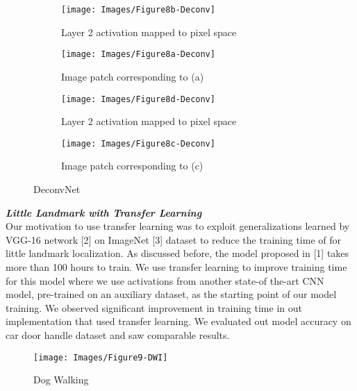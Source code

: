 \documentclass [11pt,letterpaper ,twoside ,openany ]{report}
\begin{document}
    \begin{figure}[h]
    \centering
        \begin{subfigure}[b]{0.22\linewidth}
            \centering
            \texttt{[image: Images/Figure8b-Deconv]}
            \caption{Layer 2 activation mapped to pixel space}
        \end{subfigure}    
        \begin{subfigure}[b]{0.22\linewidth}
            \centering
            \texttt{[image: Images/Figure8a-Deconv]}
            \caption{Image patch corresponding to (a)}
        \end{subfigure}
        \begin{subfigure}[b]{0.22\linewidth}
            \centering
            \texttt{[image: Images/Figure8d-Deconv]}
            \caption{Layer 2 activation mapped to pixel space}
        \end{subfigure}                
        \begin{subfigure}[b]{0.22\linewidth}
            \centering
            \texttt{[image: Images/Figure8c-Deconv]}
            \caption{Image patch corresponding to (c)}
        \end{subfigure}
        \caption{DeconvNet}
        \label{fig:devonv}
    \end{figure}

    \noindent
    \textbf{\textit{Little Landmark with Transfer Learning}}\\    
    Our motivation to use transfer learning was to exploit generalizations learned by VGG-16 network [2] on ImageNet [3] dataset to reduce the training time of for little landmark localization. As discussed before, the model proposed in [1] takes more than 100 hours to train. We use transfer learning to improve training time for this model where we use activations from another state-of the-art CNN model, pre-trained on an auxiliary dataset, as the starting point of our model training. We observed significant improvement in training time in out implementation that used transfer learning. We evaluated out model accuracy on car door handle dataset and saw comparable results.

    \begin{wrapfigure}{l}[9mm]{0.5\textwidth}
        \begin{center}
            \texttt{[image: Images/Figure9-DWI]}
        \end{center}
        \caption{Dog Walking}
    \end{wrapfigure}
\end{document}
